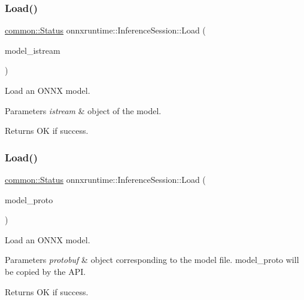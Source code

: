 \subsubsection{\texorpdfstring{Load()}{Load()}\hspace{0.1cm}{\footnotesize\ttfamily [2/4]}}
{\footnotesize\ttfamily \mbox{\hyperlink{classonnxruntime_1_1common_1_1Status}{common\+::\+Status}} onnxruntime\+::\+Inference\+Session\+::\+Load (\begin{DoxyParamCaption}\item[{std\+::istream \&}]{model\+\_\+istream }\end{DoxyParamCaption})}

Load an O\+N\+NX model. 
\begin{DoxyParams}{Parameters}
{\em istream} & object of the model. \\
\hline
\end{DoxyParams}
\begin{DoxyReturn}{Returns}
OK if success. 
\end{DoxyReturn}
\mbox{\label{classonnxruntime_1_1InferenceSession_aa5f2da68be50bff8a01e9801c28c77b2}} 
\subsubsection{\texorpdfstring{Load()}{Load()}\hspace{0.1cm}{\footnotesize\ttfamily [3/4]}}
{\footnotesize\ttfamily \mbox{\hyperlink{classonnxruntime_1_1common_1_1Status}{common\+::\+Status}} onnxruntime\+::\+Inference\+Session\+::\+Load (\begin{DoxyParamCaption}\item[{const O\+N\+N\+X\+\_\+\+N\+A\+M\+E\+S\+P\+A\+C\+E\+::\+Model\+Proto \&}]{model\+\_\+proto }\end{DoxyParamCaption})\hspace{0.3cm}{\ttfamily [protected]}}

Load an O\+N\+NX model. 
\begin{DoxyParams}{Parameters}
{\em protobuf} & object corresponding to the model file. model\+\_\+proto will be copied by the A\+PI. \\
\hline
\end{DoxyParams}
\begin{DoxyReturn}{Returns}
OK if success. 
\end{DoxyReturn}
\mbox{\label{classonnxruntime_1_1InferenceSession_aa26b302ae1387cbd87025470a8ebb449}} 
